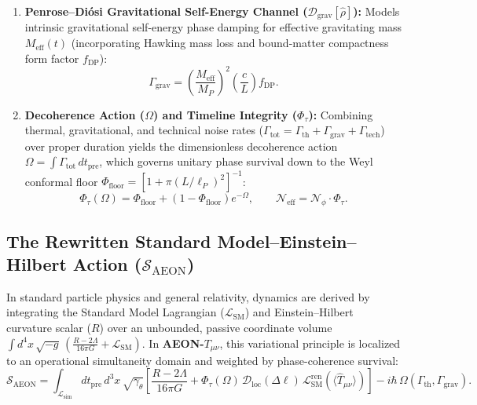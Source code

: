 \documentclass[11pt,a4paper]{article}
\begin{document}
\begin{enumerate}[leftmargin=1.5em]
    \item \textbf{Penrose--Diósi Gravitational Self-Energy Channel ($\mathcal{D}_{\text{grav}}[\hat{\rho}]$):} Models intrinsic gravitational self-energy phase damping for effective gravitating mass $M_{\text{eff}}(t)$ (incorporating Hawking mass loss and bound-matter compactness form factor $f_{\text{DP}}$):
    \begin{equation}
    \Gamma_{\text{grav}} = \left(\frac{M_{\text{eff}}}{M_P}\right)^2 \left(\frac{c}{L}\right) f_{\text{DP}}.
    \end{equation}
    \item \textbf{Decoherence Action ($\Omega$) and Timeline Integrity ($\Phi_\tau$):} Combining thermal, gravitational, and technical noise rates ($\Gamma_{\text{tot}} = \Gamma_{\text{th}} + \Gamma_{\text{grav}} + \Gamma_{\text{tech}}$) over proper duration yields the dimensionless decoherence action $\Omega = \int \Gamma_{\text{tot}}\,dt_{\text{pre}}$, which governs unitary phase survival down to the Weyl conformal floor $\Phi_{\text{floor}} = [1 + \pi (L/\ell_P)^2]^{-1}$:
    \begin{equation}
    \Phi_\tau(\Omega) = \Phi_{\text{floor}} + \left(1 - \Phi_{\text{floor}}\right)e^{-\Omega}, \qquad \mathcal{N}_{\text{eff}} = \mathcal{N}_\phi \cdot \Phi_\tau.
    \end{equation}
\end{enumerate}

\subsection{The Rewritten Standard Model--Einstein--Hilbert Action ($\mathcal{S}_{\text{AEON}}$)}
In standard particle physics and general relativity, dynamics are derived by integrating the Standard Model Lagrangian ($\mathcal{L}_{\text{SM}}$) and Einstein--Hilbert curvature scalar ($R$) over an unbounded, passive coordinate volume $\int d^4x\,\sqrt{-g}\,(\frac{R - 2\Lambda}{16\pi G} + \mathcal{L}_{\text{SM}})$. In \textbf{AEON-$T_{\mu\nu}$}, this variational principle is localized to an operational simultaneity domain and weighted by phase-coherence survival:
\begin{equation}
\mathcal{S}_{\text{AEON}} = \int_{\mathcal{L}_{\text{sim}}} dt_{\text{pre}}\, d^3x\,\sqrt{\gamma_{\theta}} \left[ \frac{R - 2\Lambda}{16\pi G} + \Phi_\tau(\Omega)\,\mathcal{D}_{\text{loc}}(\Delta\ell)\,\mathcal{L}_{\text{SM}}^{\text{ren}}\!\left(\langle \hat{T}_{\mu\nu}\rangle\right) \right] - i\hbar\,\Omega(\Gamma_{\text{th}}, \Gamma_{\text{grav}}).
\label{eq:action_aeon}
\end{equation}
\end{document}
